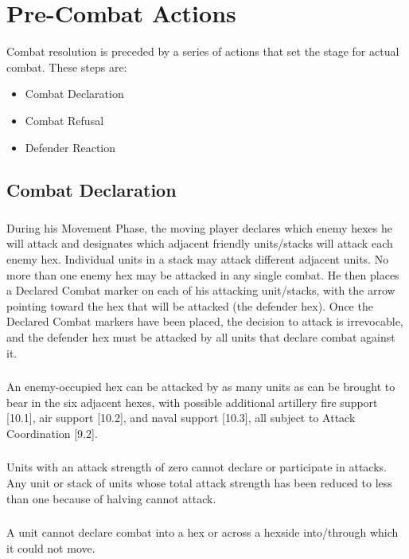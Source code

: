 \section{Pre-Combat Actions}
Combat resolution is preceded by a series of actions that set the stage for actual combat. These steps are:
\begin{itemize}
    \item Combat Declaration
    \item Combat Refusal
    \item Defender Reaction
\end{itemize}
\subsection{Combat Declaration}
\subsubsection{}
During his Movement Phase, the moving player declares which enemy hexes he will attack and designates which adjacent friendly units/stacks will attack each enemy hex. Individual units in a stack may attack different adjacent units. No more than one enemy hex may be attacked in any single combat. He then places a Declared Combat marker on each of his attacking unit/stacks, with the arrow pointing toward the hex that will be attacked (the defender hex). Once the Declared Combat markers have been placed, the decision to attack is irrevocable, and the defender hex must be attacked by all units that declare combat against it.

\subsubsection{}
An enemy-occupied hex can be attacked by as many units as can be brought to bear in the six adjacent hexes, with possible additional artillery fire support [10.1], air support [10.2], and naval support [10.3], all subject to Attack Coordination [9.2].

\subsubsection{}
Units with an attack strength of zero cannot declare or participate in attacks. Any unit or stack of units whose total attack strength has been reduced to less than one because of halving cannot attack.

\subsubsection{}
A unit cannot declare combat into a hex or across a hexside into/through which it could not move.

